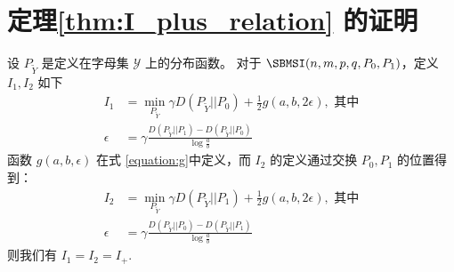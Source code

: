 \section{定理\ref{thm:I_plus_relation} 的证明}
	\begin{lemma}\label{lem:p0p12}
        设 $P_{\widetilde{Y}}$ 是定义在字母集
        $\mathcal{Y}$ 上的分布函数。
		对于 $\SBMSI(n,m,p,q,P_0,P_1)$，定义
        $I_1, I_2$ 如下
		\begin{align}
			I_1 &=\min_{P_{\widetilde{Y}}} \gamma D(P_{\widetilde{Y}}|| P_0)+ \frac{1}{2} g(a,b, 2\epsilon),
            \text{ 其中}\nonumber\\
			\epsilon &= \gamma \frac{D(P_{\widetilde{Y}} || P_1) - D(P_{\widetilde{Y}} || P_0) }{\log \frac{a}{b}}\label{eq:I1}
		\end{align}
        函数 $g(a,b,\epsilon)$ 在式 \eqref{equation:g}中定义，而 $I_2$ 的定义通过交换 $P_0, P_1$ 的位置得到：
		\begin{align}
			I_2 & = \min_{P_{\widetilde{Y}}} \gamma D(P_{\widetilde{Y}}|| P_1)+ \frac{1}{2} g(a,b, 2\epsilon),
            \text{ 其中}\nonumber\\
			\epsilon &= \gamma \frac{D(P_{\widetilde{Y}} || P_0) - D(P_{\widetilde{Y}} || P_1) }{\log \frac{a}{b}}
            \label{eq:I2}
		\end{align}
 		则我们有 $I_1=I_2=I_+$. 
    \end{lemma}
